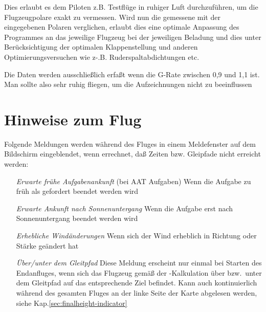 Dies erlaubt es dem Piloten z.B. Testflüge in ruhiger Luft durchzuführen, um die Flugzeugpolare exakt zu vermessen.
Wird nun die gemessene  mit der eingegebenen Polaren verglichen, erlaubt dies eine optimale Anpassung des Programmes an das jeweilige Flugzeug bei der jeweiligen Beladung und dies unter Berücksichtigung der optimalen Klappenstellung und anderen Optimierungsversuchen wie z-.B. Ruderspaltabdichtungen etc.

Die Daten werden ausschließlich erfaßt wenn die G-Rate zwischen 0,9 und 1,1 ist.
Man sollte also sehr ruhig fliegen, um die Aufzeichnungen nicht zu beeinflussen



\section{Hinweise zum Flug}
Folgende Meldungen werden während des Fluges in einem
Meldefenster auf dem Bildschirm eingeblendet, wenn \xc errechnet, daß Zeiten bzw. Gleipfade nicht erreicht werden:

\begin{itemize}
\item[\textit{Erwarte frühe Aufgabenankunft}]  (bei AAT Aufgaben) Wenn die Aufgabe zu früh als gefordert beendet werden wird
\item[\textit{Erwarte Ankunft nach Sonnenuntergang}] Wenn die Aufgabe erst nach Sonnenuntergang beendet werden wird
\item[\textit{Erhebliche Windänderungen}] Wenn sich der Wind erheblich in Richtung oder Stärke geändert hat
\item[\textit{Über/unter dem Gleitpfad}]  Diese Meldung erscheint nur einmal bei Starten des Endanfluges, wenn sich das Flugzeug gemäß der \xc-Kalkulation über bzw.\ unter dem Gleitpfad auf das entsprechende Ziel befindet. 
Kann auch kontinuierlich während des gesamten Fluges an der linke Seite der Karte abgelesen werden, siehe Kap.\ref{sec:finalheight-indicator}
\end{itemize}
